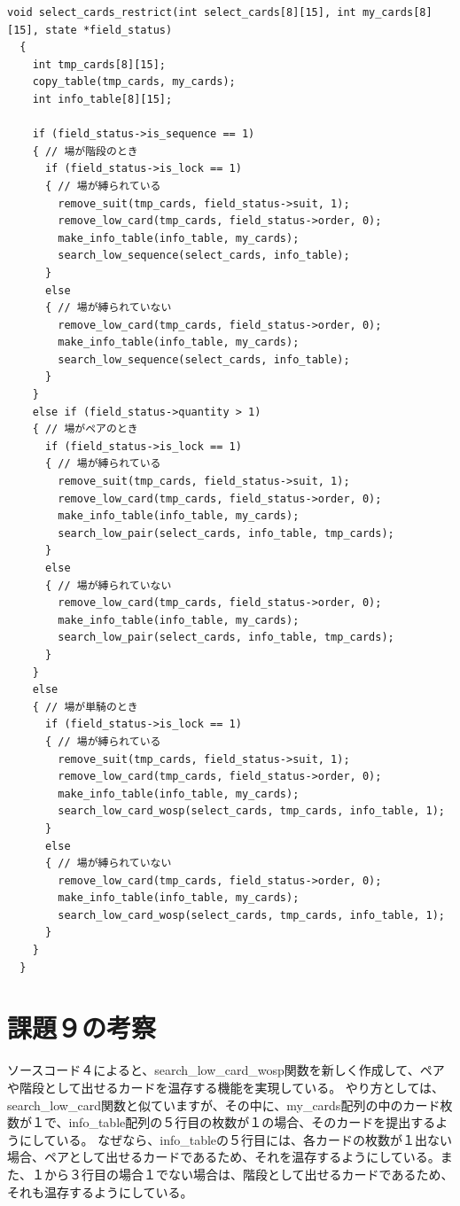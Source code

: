\documentclass[]{jsarticle}
\begin{document}
\begin{lstlisting}[caption={select\_cards.c}]
  void select_cards_restrict(int select_cards[8][15], int my_cards[8][15], state *field_status)
  {
    int tmp_cards[8][15];
    copy_table(tmp_cards, my_cards);
    int info_table[8][15];
  
    if (field_status->is_sequence == 1)
    { // 場が階段のとき
      if (field_status->is_lock == 1)
      { // 場が縛られている
        remove_suit(tmp_cards, field_status->suit, 1);
        remove_low_card(tmp_cards, field_status->order, 0);
        make_info_table(info_table, my_cards);
        search_low_sequence(select_cards, info_table);
      }
      else
      { // 場が縛られていない
        remove_low_card(tmp_cards, field_status->order, 0);
        make_info_table(info_table, my_cards);
        search_low_sequence(select_cards, info_table);
      }
    }
    else if (field_status->quantity > 1)
    { // 場がペアのとき
      if (field_status->is_lock == 1)
      { // 場が縛られている
        remove_suit(tmp_cards, field_status->suit, 1);
        remove_low_card(tmp_cards, field_status->order, 0);
        make_info_table(info_table, my_cards);
        search_low_pair(select_cards, info_table, tmp_cards);
      }
      else
      { // 場が縛られていない
        remove_low_card(tmp_cards, field_status->order, 0);
        make_info_table(info_table, my_cards);
        search_low_pair(select_cards, info_table, tmp_cards);
      }
    }
    else
    { // 場が単騎のとき
      if (field_status->is_lock == 1)
      { // 場が縛られている
        remove_suit(tmp_cards, field_status->suit, 1);
        remove_low_card(tmp_cards, field_status->order, 0);
        make_info_table(info_table, my_cards);
        search_low_card_wosp(select_cards, tmp_cards, info_table, 1);
      }
      else
      { // 場が縛られていない
        remove_low_card(tmp_cards, field_status->order, 0);
        make_info_table(info_table, my_cards);
        search_low_card_wosp(select_cards, tmp_cards, info_table, 1);
      }
    }
  }
\end{lstlisting}

\section*{課題９の考察}
ソースコード４によると、search\_low\_card\_wosp関数を新しく作成して、ペアや階段として出せるカードを温存する機能を実現している。
やり方としては、search\_low\_card関数と似ていますが、その中に、my\_cards配列の中のカード枚数が１で、info\_table配列の５行目の枚数が１の場合、そのカードを提出するようにしている。
なぜなら、info\_tableの５行目には、各カードの枚数が１出ない場合、ペアとして出せるカードであるため、それを温存するようにしている。また、１から３行目の場合１でない場合は、階段として出せるカードであるため、それも温存するようにしている。\\
\end{document}
